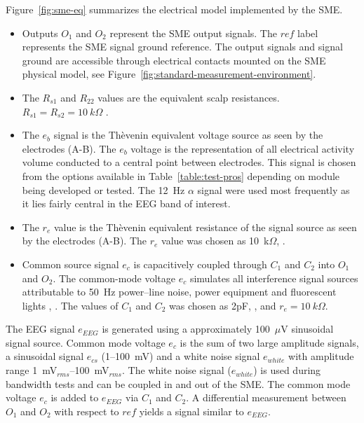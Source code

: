 Figure~\vref{fig:sme-eq} summarizes the electrical model implemented
by the SME.
\begin{itemize}

	\item{Outputs $O_1$ and $O_2$ represent the SME output
	signals. The $ref$ label represents the SME signal ground
	reference. The output signals and signal ground are accessible
	through electrical contacts mounted on the SME physical model, see
	Figure~\vref{fig:standard-measurement-environment}.}


	\item{The $R_{s1}$ and $R_{22}$ values are the equivalent scalp
	resistances. $R_{s1} = R_{s2} = 10~k\Omega$
	\cite{intro-to-bio}.}

	\item{The $e_b$ signal is the Th\`{e}venin equivalent voltage
	source as seen by the electrodes (A-B). The $e_b$ voltage is the
	representation of all electrical activity volume conducted to a
	central point between electrodes. This signal is chosen from the
	options available in Table~\ref{table:test-pros} depending on
	module being developed or tested. The 12~Hz $\alpha$ signal were
	used most frequently as it lies fairly central in the EEG band of
	interest.}

	\item{The $r_e$ value is the Th\`{e}venin equivalent resistance of
	the signal source as seen by the electrodes (A-B). The $r_e$ value
	was chosen as 10~k$\Omega$, \cite{intro-to-bio}.}

	\item{Common source signal $e_c$ is capacitively coupled through
	$C_1$ and $C_2$ into $O_1$ and $O_2$. The common-mode voltage
	$e_c$ simulates all interference signal sources attributable to
	50~Hz power--line noise, power equipment and fluorescent lights
	\cite{fluorescent-interference},
	\cite{fluorescent-interference2}. The values of $C_1$ and $C_2$
	was chosen as 2pF, \cite{drive}, and $r_e = 10~k\Omega$.}
\end{itemize}

The EEG signal $e_{EEG}$ is generated using a approximately 100~$\mu$V
sinusoidal signal source. Common mode voltage $e_c$ is the sum of two
large amplitude signals, a sinusoidal signal $e_{cs}$ (1--100~mV) and
a white noise signal $e_{white}$ with amplitude range
1~mV$_{rms}$--100~mV$_{rms}$. The white noise signal ($e_{white}$) is
used during bandwidth tests and can be coupled in and out of the
SME. The common mode voltage $e_c$ is added to $e_{EEG}$ via $C_1$ and
$C_2$. A differential measurement between $O_1$ and $O_2$ with respect
to $ref$ yields a signal similar to $e_{EEG}$.

